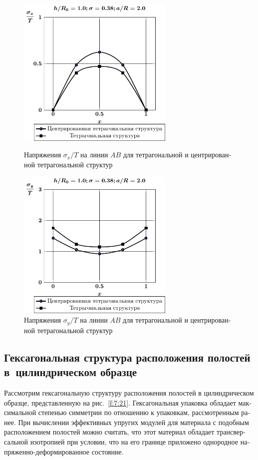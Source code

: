 \begin{russian}
\begin{figure}[h!]
\centering\footnotesize
\parbox[b]{7.5cm}{\centering\includegraphics[width=7.5cm]{cav5-4-sig_x.pdf}
\caption{Напряжения $\sigma_x/T$ на линии $AB$ для тетрагональной и центрированной тетрагональной структур
\label{f:7:19}}}\hfil\hfil
\parbox[b]{7.5cm}{\centering\includegraphics[width=7.5cm]{cav5-4-sig_y.pdf}
\caption{Напряжения $\sigma_y/T$ на линии $AB$ для тетрагональной и центрированной тетрагональной структур
\label{f:7:20}}}
\end{figure}

\subsection{Гексагональная структура расположения полостей в~цилиндрическом образце}

Рассмотрим гексагональную структуру расположения полостей в цилиндрическом образце, представленную на рис.~\ref{f:7:21}. Гексагональная упаковка обладает максимальной степенью симметрии по отношению к упаковкам, рассмотренным ранее. При вычислении эффективных упругих модулей для материала с подобным расположением полостей можно считать, что этот материал обладает трансверсальной изотропией при условии, что на его границе приложено однородное напряженно-деформированное состояние.


\end{russian}
